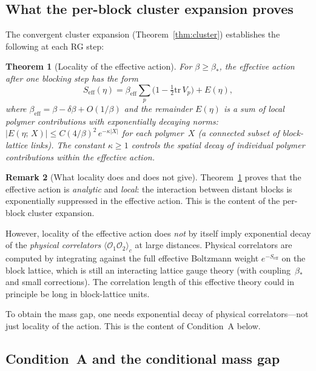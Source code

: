 \documentclass[11pt]{article}
\newtheorem{theorem}{Theorem}[section]
\theoremstyle{definition}
\newtheorem{remark}[theorem]{Remark}
\newcommand{\tr}{\mathrm{tr}}
\begin{document}
\subsection{What the per-block cluster expansion proves}

The convergent cluster expansion (Theorem~\ref{thm:cluster}) establishes
the following at each RG step:

\begin{theorem}[Locality of the effective action]\label{thm:locality}
For $\beta\ge\beta_*$, the effective action after one blocking step has
the form
\[
S_{\mathrm{eff}}(\eta)=\beta_{\mathrm{eff}}\sum_p
\bigl(1-\tfrac{1}{2}\tr\,V_p\bigr)+E(\eta),
\]
where $\beta_{\mathrm{eff}}=\beta-\delta\beta+O(1/\beta)$ and the
remainder $E(\eta)$ is a sum of \emph{local} polymer contributions
with exponentially decaying norms:
$|E(\eta;\,X)|\le C(4/\beta)^2\,e^{-\kappa|X|}$
for each polymer~$X$ (a connected subset of block-lattice links).
The constant $\kappa\ge 1$ controls the spatial decay of individual
polymer contributions within the effective action.
\end{theorem}

\begin{remark}[What locality does and does not give]
\label{rem:locality-gap}
Theorem~\ref{thm:locality} proves that the effective action is
\emph{analytic} and \emph{local}: the interaction between distant
blocks is exponentially suppressed in the effective action.  This
is the content of the per-block cluster expansion.

However, locality of the effective action does \emph{not} by itself
imply exponential decay of the \emph{physical correlators}
$\langle\mathcal{O}_1\mathcal{O}_2\rangle_c$ at large distances.
Physical correlators are computed by integrating against the full
effective Boltzmann weight $e^{-S_{\mathrm{eff}}}$ on the
block lattice, which is still an interacting lattice gauge theory
(with coupling~$\beta_*$ and small corrections).  The correlation
length of this effective theory could in principle be long in
block-lattice units.

To obtain the mass gap, one needs exponential decay of physical
correlators---not just locality of the action.  This is the
content of Condition~A below.
\end{remark}

\subsection{Condition~A and the conditional mass gap}
\end{document}
